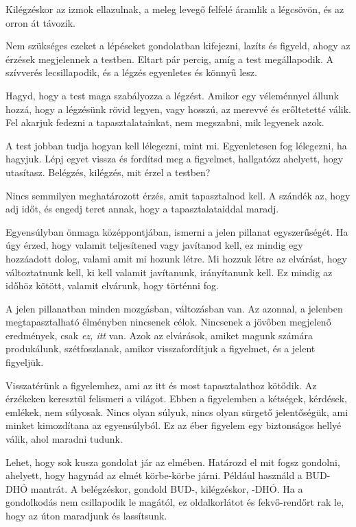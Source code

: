 Kilégzéskor az izmok ellazulnak, a meleg levegő felfelé áramlik a
légcsövön, és az orron át távozik.

Nem szükséges ezeket a lépéseket gondolatban kifejezni, lazíts és
figyeld, ahogy az érzések megjelennek a testben. Eltart pár percig, amíg
a test megállapodik. A szívverés lecsillapodik, és a légzés egyenletes
és könnyű lesz.

Hagyd, hogy a test maga szabályozza a légzést. Amikor egy véleménnyel
állunk hozzá, hogy a légzésünk rövid legyen, vagy hosszú, az merevvé és
erőltetetté válik. Fel akarjuk fedezni a tapasztalatainkat, nem
megszabni, mik legyenek azok.

A test jobban tudja hogyan kell lélegezni, mint mi. Egyenletesen fog
lélegezni, ha hagyjuk. Lépj egyet vissza és fordítsd meg a figyelmet,
hallgatózz ahelyett, hogy utasítasz. Belégzés, kilégzés, mit érzel a
testben?

Nincs semmilyen meghatározott érzés, amit tapasztalnod kell. A szándék
az, hogy adj időt, és engedj teret annak, hogy a tapasztalataiddal
maradj.

Egyensúlyban önmaga középpontjában, ismerni a jelen pillanat
egyszerűségét. Ha úgy érzed, hogy valamit teljesítened vagy javítanod
kell, ez mindig egy hozzáadott dolog, valami amit mi hozunk létre. Mi
hozzuk létre az elvárást, hogy változtatnunk kell, ki kell valamit
javítanunk, irányítanunk kell. Ez mindig az időhöz kötött, valamit
elvárunk, hogy történni fog.

A jelen pillanatban minden mozgásban, változásban van. Az azonnal, a
jelenben megtapasztalható élményben nincsenek célok. Nincsenek a jövőben
megjelenő eredmények, csak \emph{ez, itt} van. Azok az elvárások, amiket
magunk számára produkálunk, szétfoszlanak, amikor visszafordítjuk a
figyelmet, és a jelent figyeljük.

Visszatérünk a figyelemhez, ami az itt és most tapasztalathoz kötődik.
Az érzékeken keresztül felismeri a világot. Ebben a figyelemben a
kétségek, kérdések, emlékek, nem súlyosak. Nincs olyan súlyuk, nincs
olyan sürgető jelentőségük, ami minket kimozdítana az egyensúlyból. Ez
az éber figyelem egy biztonságos hellyé válik, ahol maradni tudunk.

Lehet, hogy sok kusza gondolat jár az elmében. Határozd el mit fogsz
gondolni, ahelyett, hogy hagynád az elmét körbe-körbe járni. Például
használd a BUD-DHÓ mantrát. A belégzéskor, gondold BUD-, kilégzéskor,
-DHÓ. Ha a gondolkodás nem csillapodik le magától, ez oldalkorlátot és
fekvő-rendőrt rak le, hogy az úton maradjunk és lassítsunk.


